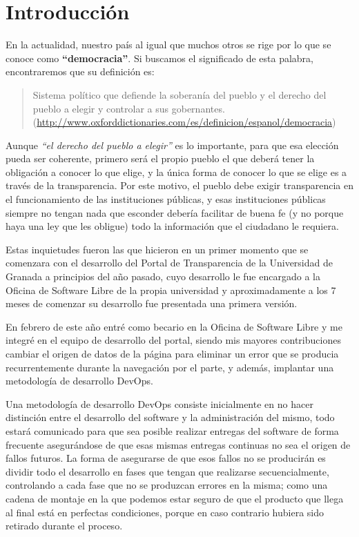 \chapter{Introducción}

En la actualidad, nuestro país al igual que muchos otros se rige por lo que se conoce como \textbf{``democracia''}. Si buscamos
el significado de esta palabra, encontraremos que su definición es: 

\begin{quote}Sistema político que defiende la soberanía del pueblo y el derecho del pueblo a elegir y controlar a sus 
gobernantes.
\newline(\url{http://www.oxforddictionaries.com/es/definicion/espanol/democracia})
\end{quote}

Aunque \textit{``el derecho del pueblo a elegir''} es lo importante, para que esa elección pueda ser coherente, primero será el propio
pueblo el que deberá tener la obligación a conocer lo que elige, y la única forma de conocer lo que se elige es a través de la
transparencia. Por este motivo, el pueblo debe exigir transparencia en el funcionamiento de las instituciones públicas, y esas
instituciones públicas siempre no tengan nada que esconder debería facilitar de buena fe (y no porque haya una ley que les 
obligue) todo la información que el ciudadano le requiera.

\bigskip
Estas inquietudes fueron las que hicieron en un primer momento que se comenzara con el desarrollo del Portal de Transparencia
de la Universidad de Granada a principios del año pasado, cuyo desarrollo le fue encargado a la Oficina de Software Libre de la propia universidad y 
aproximadamente a los 7 meses de comenzar su desarrollo fue presentada una primera versión.

\bigskip
En febrero de este año entré como becario en la Oficina de Software Libre y me integré en el equipo de desarrollo del portal,
siendo mis mayores contribuciones cambiar el origen de datos de la página para eliminar un error que se producia recurrentemente
durante la navegación por el parte, y además, implantar una metodología de desarrollo DevOps.

\newpage
Una metodología de desarrollo DevOps consiste inicialmente en no hacer distinción entre el desarrollo del software y la
administración del mismo, todo estará comunicado para que sea posible realizar entregas del software de forma frecuente 
asegurándose de que esas mismas entregas continuas no sea el origen de fallos futuros. La forma de asegurarse de que esos
fallos no se producirán es dividir todo el desarrollo en fases que tengan que realizarse secuencialmente, controlando a cada
fase que no se produzcan errores en la misma; como una cadena de montaje en la que podemos estar seguro de que el producto
que llega al final está en perfectas condiciones, porque en caso contrario hubiera sido retirado durante el proceso.

